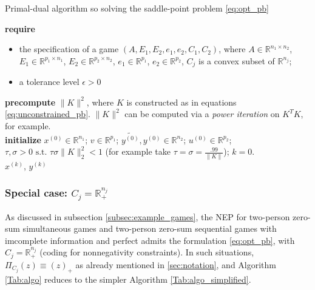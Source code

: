 \documentclass[a4paper,9pt,journal]{IEEEtran}
\begin{document}
\begin{algorithm}[htb]
  \caption{Primal-dual algorithm so solving the saddle-point problem \eqref{eq:opt_pb}}
  \textbf{require}
  \begin{itemize}
    \item the specification of a game $(A, E_1, E_2, e_1, e_2, C_1, C_2)$, where $A \in \mathbb{R}^{n_1 \times n_2}$,
  $E_1 \in \mathbb{R}^{p_1 \times n_1}$, $E_2 \in \mathbb{R}^{p_2 \times n_2}$, $e_1 \in \mathbb{R}^{p_1}$, $e_2 \in \mathbb{R}^{p_2}$, $C_j$ is a convex subset of $\mathbb{R}^{n_j}$;
      \item a tolerance level $\epsilon > 0$
  \end{itemize}
  \textbf{precompute} $\|K\|^2$, where $K$ is constructed as in equations \eqref{eq:unconstrained_pb}. $\|K\|^2$ can be computed via a \textit{power iteration} on $K^TK$, for example.\\
  \textbf{initialize}
  $x^{(0)} \in \mathbb{R}^{n_1}$; $v \in \mathbb{R}^{p_1}$; $\tilde{y^{(0)}}, y^{(0)} \in \mathbb{R}^{n_2}$; $u^{(0)} \in \mathbb{R}^{p_2}$; 
  $\tau, \sigma > 0 \text{ s.t. }\tau\sigma \|K\|_2^2 < 1$ (for example take $\tau = \sigma = \frac{.99}{\|K\|}$); $k = 0$.\\
   \Return $x^{(k)}$, $y^{(k)}$
  \label{Tab:algo}
\end{algorithm}

\subsubsection{Special case: $C_j = \mathbb{R}^{n_j}_+$} As discussed in subsection \ref{subsec:example_games},
the NEP for two-person zero-sum simultaneous games and two-person zero-sum sequential games with imcomplete
information and perfect admits the formulation \eqref{eq:opt_pb}, with $C_j = \mathbb{R}^{n_j}_+$ (coding for nonnegativity constraints).
In such situations, $\Pi_{C_j}(z) \equiv (z)_+$ as already mentioned in \ref{sec:notation}, and Algorithm \ref{Tab:algo} reduces to the simpler Algorithm \ref{Tab:algo_simplified}.
\end{document}

